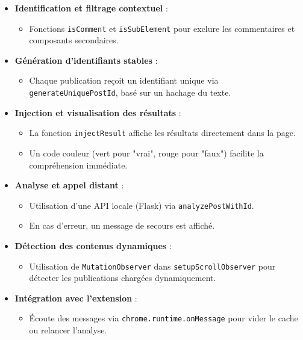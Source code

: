 \begin{description}
\begin{itemize}
    \item \textbf{Identification et filtrage contextuel} :
    \begin{itemize}
        \item Fonctions \texttt{isComment} et \texttt{isSubElement} pour exclure les commentaires et composants secondaires.
    \end{itemize}

    \item \textbf{Génération d’identifiants stables} :
    \begin{itemize}
        \item Chaque publication reçoit un identifiant unique via \texttt{generateUniquePostId}, basé sur un hachage du texte.
    \end{itemize}

    \item \textbf{Injection et visualisation des résultats} :
    \begin{itemize}
        \item La fonction \texttt{injectResult} affiche les résultats directement dans la page.
        \item Un code couleur (vert pour "vrai", rouge pour "faux") facilite la compréhension immédiate.
    \end{itemize}

    \item \textbf{Analyse et appel distant} :
    \begin{itemize}
        \item Utilisation d’une API locale (Flask) via \texttt{analyzePostWithId}.
        \item En cas d’erreur, un message de secours est affiché.
    \end{itemize}

    \item \textbf{Détection des contenus dynamiques} :
    \begin{itemize}
        \item Utilisation de \texttt{MutationObserver} dans \texttt{setupScrollObserver} pour détecter les publications chargées dynamiquement.
    \end{itemize}

    \item \textbf{Intégration avec l’extension} :
    \begin{itemize}
        \item Écoute des messages via \texttt{chrome.runtime.onMessage} pour vider le cache ou relancer l’analyse.
    \end{itemize}


\end{itemize}
\end{description}
